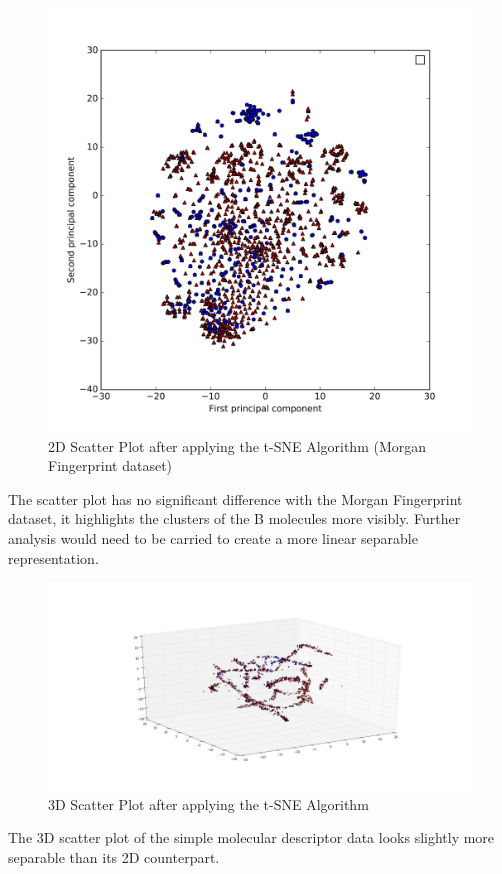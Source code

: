 \documentclass[a4paper,12pt]{report}
\begin{document}
		\begin{figure}[H]
			\centering
			\includegraphics[width=\textwidth,scale=1,totalheight=0.5\textheight]{images/scatter_tsne_mfps}
			\caption{2D Scatter Plot after applying the t-SNE Algorithm (Morgan Fingerprint dataset)}
			\label{fig:scatter_tsne_mfps_2D}
		\end{figure}
		The scatter plot has no significant difference with the Morgan Fingerprint dataset, it highlights the clusters of the B molecules more visibly. Further analysis would need to be carried to create a more linear separable representation.
		\begin{figure}[H]
			\centering
			\includegraphics[width=\textwidth,scale=1,totalheight=0.5\textheight]{images/scatter_tsne_3D}
			\caption{3D Scatter Plot after applying the t-SNE Algorithm}
			\label{fig:scatter_tsne_3D}
		\end{figure}
		The 3D scatter plot of the simple molecular descriptor data looks slightly more separable than its 2D counterpart.
\end{document}

